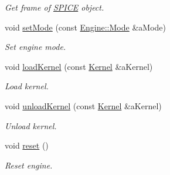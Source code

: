 \begin{DoxyCompactItemize}
\begin{DoxyCompactList}\small\item\em Get frame of \hyperlink{classlibrary_1_1physics_1_1env_1_1ephem_1_1_s_p_i_c_e}{S\+P\+I\+CE} object. \end{DoxyCompactList}\item 
void \hyperlink{classlibrary_1_1physics_1_1env_1_1ephem_1_1spice_1_1_engine_a0e4ba12bfad03f16aa64cdcc352ad777}{set\+Mode} (const \hyperlink{classlibrary_1_1physics_1_1env_1_1ephem_1_1spice_1_1_engine_a2d185a63bce354bff9ad38810410eab4}{Engine\+::\+Mode} \&a\+Mode)
\begin{DoxyCompactList}\small\item\em Set engine mode. \end{DoxyCompactList}\item 
void \hyperlink{classlibrary_1_1physics_1_1env_1_1ephem_1_1spice_1_1_engine_ad4bc48d95aadb38a755e2aaf60acaf55}{load\+Kernel} (const \hyperlink{classlibrary_1_1physics_1_1env_1_1ephem_1_1spice_1_1_kernel}{Kernel} \&a\+Kernel)
\begin{DoxyCompactList}\small\item\em Load kernel. \end{DoxyCompactList}\item 
void \hyperlink{classlibrary_1_1physics_1_1env_1_1ephem_1_1spice_1_1_engine_a00f5e8f4ad56ce48cf291b3a3356970f}{unload\+Kernel} (const \hyperlink{classlibrary_1_1physics_1_1env_1_1ephem_1_1spice_1_1_kernel}{Kernel} \&a\+Kernel)
\begin{DoxyCompactList}\small\item\em Unload kernel. \end{DoxyCompactList}\item 
void \hyperlink{classlibrary_1_1physics_1_1env_1_1ephem_1_1spice_1_1_engine_a949c14d9c53ea21c29f1945ef43f0cd9}{reset} ()
\begin{DoxyCompactList}\small\item\em Reset engine. \end{DoxyCompactList}\end{DoxyCompactItemize}
